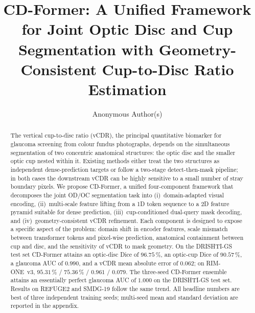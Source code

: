 \documentclass[runningheads]{llncs}
\begin{document}
\title{CD-Former: A Unified Framework for Joint Optic Disc and Cup Segmentation with Geometry-Consistent Cup-to-Disc Ratio Estimation}


\author{Anonymous Author(s)}

\maketitle

\begin{abstract}
The vertical cup-to-disc ratio (vCDR), the principal quantitative biomarker for glaucoma screening from colour fundus photographs, depends on the simultaneous segmentation of two concentric anatomical structures: the optic disc and the smaller optic cup nested within it. Existing methods either treat the two structures as independent dense-prediction targets or follow a two-stage detect-then-mask pipeline; in both cases the downstream vCDR can be highly sensitive to a small number of stray boundary pixels. We propose CD-Former, a unified four-component framework that decomposes the joint OD/OC segmentation task into (i)~domain-adapted visual encoding, (ii)~multi-scale feature lifting from a 1D token sequence to a 2D feature pyramid suitable for dense prediction, (iii)~cup-conditioned dual-query mask decoding, and (iv)~geometry-consistent vCDR refinement. Each component is designed to expose a specific aspect of the problem: domain shift in encoder features, scale mismatch between transformer tokens and pixel-wise prediction, anatomical containment between cup and disc, and the sensitivity of vCDR to mask geometry. On the DRISHTI-GS test set CD-Former attains an optic-disc Dice of $96.75\,\%$, an optic-cup Dice of $90.57\,\%$, a glaucoma AUC of $0.990$, and a vCDR mean absolute error of $0.062$; on RIM-ONE~v3, $95.31\,\%$ / $75.36\,\%$ / $0.961$ / $0.079$. The three-seed CD-Former ensemble attains an essentially perfect glaucoma AUC of $1.000$ on the DRISHTI-GS test set. Results on REFUGE2 and SMDG-19 follow the same trend. All headline numbers are best of three independent training seeds; multi-seed mean and standard deviation are reported in the appendix.

\end{abstract}
\end{document}
